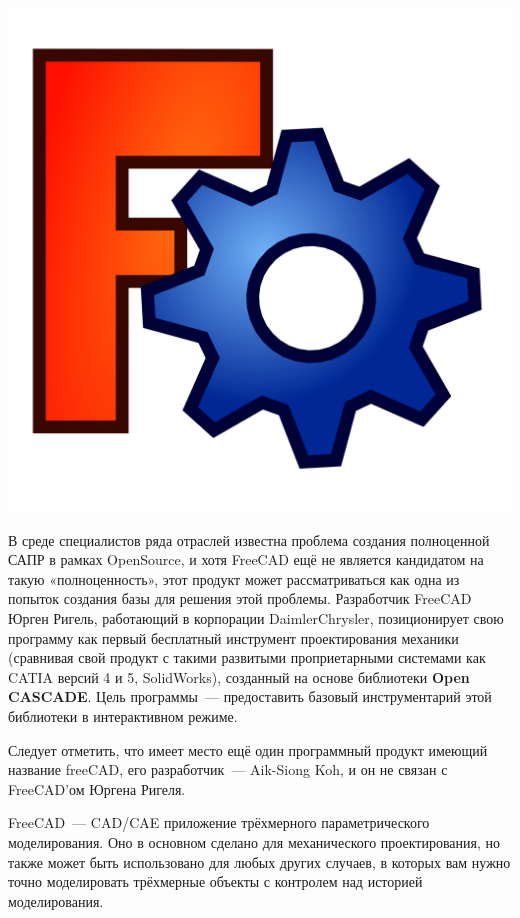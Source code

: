 
\includegraphics[height=0.5\textheight]{logo/FreeCAD.png}

В среде специалистов ряда отраслей известна проблема создания полноценной САПР в
рамках OpenSource, и хотя FreeCAD ещё не является кандидатом на такую
«полноценность», этот продукт может рассматриваться как одна из попыток создания
базы для решения этой проблемы. Разработчик FreeCAD Юрген Ригель, работающий в
корпорации DaimlerChrysler, позиционирует свою программу как первый бесплатный
инструмент проектирования механики (сравнивая свой продукт с такими развитыми
проприетарными системами как CATIA версий 4 и 5, SolidWorks), созданный на
основе библиотеки \textbf{Open CASCADE}. Цель программы\ --- предоставить
базовый инструментарий этой библиотеки в интерактивном режиме.

Следует отметить, что имеет место ещё один программный продукт имеющий название
freeCAD, его разработчик\ --- Aik-Siong Koh, и он не связан с FreeCAD’ом Юргена
Ригеля.

\bigskip{}
FreeCAD\ --- CAD/CAE приложение трёхмерного параметрического моделирования.
Оно в основном сделано для механического проектирования, но также может быть
использовано для любых других случаев, в которых вам нужно точно моделировать
трёхмерные объекты с контролем над историей моделирования.

